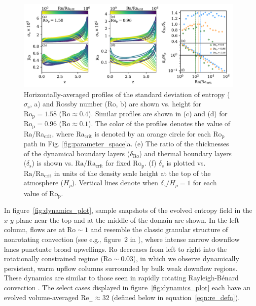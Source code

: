 \documentclass[twocolumn, amsmath, amsfonts, amssymb, trackchanges]{aastex62}
\newcommand{\RB}{Rayleigh-B\'{e}nard }
\newcommand{\pro}{\ensuremath{\text{Ro}_{\text{p}}}}
\begin{document}
\begin{figure}[ht!]
    \includegraphics[width=\textwidth]{boundary_layers.pdf}
    \caption{Horizontally-averaged profiles of the standard deviation of entropy ($\sigma_{\text{s}}$, a) and Rossby number (Ro, b) 
    are shown vs. height for $\pro = 1.58$ ($\text{Ro} \approx 0.4$). 
    Similar profiles are shown in (c) and (d) for $\pro = 0.96$ ($\text{Ro} \approx 0.1$). The color of the profiles
    denotes the value of Ra/Ra$_{\text{crit}}$, where Ra$_\text{crit}$ is denoted by
	an orange circle for each \pro$\,$ path in Fig. \ref{fig:parameter_space}a.
    (e) The ratio of the thicknesses of the dynamical boundary layers ($\delta_{\text{Ro}}$) and 
    thermal boundary layers ($\delta_{\text{s}}$) is shown vs. $\text{Ra}/\text{Ra}_{\text{crit}}$ for fixed \pro.
	(f) $\delta_{\text{s}}$ is plotted vs. $\text{Ra}/\text{Ra}_{\text{crit}}$ in units of the density
	scale height at the top of the atmosphere ($H_\rho$). Vertical lines denote when $\delta_\text{s}/H_\rho = 1$
	for each value of \pro.
    \label{fig:profiles_and_bls} }
\end{figure}

In figure~\ref{fig:dynamics_plot}, sample snapshots of the evolved entropy field 
in the $x$-$y$ plane near the top and at the middle of the domain are shown. 
In the left column, flows are at $\text{Ro} \sim 1$ and resemble the classic granular structure 
of nonrotating convection (see e.g., figure~2 in \AB), where intense narrow downflow lanes 
punctuate broad upwellings. Ro decreases from left to right into the rotationally constrained 
regime ($\text{Ro} \sim 0.03$), in which we observe dynamically persistent, warm upflow columns 
surrounded by bulk weak downflow regions. These dynamics are similar to those seen in rapidly 
rotating \RB convection \citep[e.g.,][]{stellmach&all2014}. 
The select cases displayed in figure~\ref{fig:dynamics_plot} each have an evolved volume-averaged
$\text{Re}_{\perp} \approx 32$ (defined below in equation~\ref{eqn:re_defn}).
\end{document}
